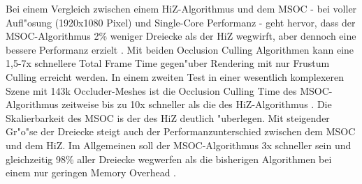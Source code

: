 \documentclass[journal]{vgtc}
\begin{document}
Bei einem Vergleich zwischen einem HiZ-Algorithmus und dem MSOC - bei voller Aufl"osung (1920x1080 Pixel) und Single-Core Performanz - geht hervor, dass der MSOC-Algorithmus 2\% weniger Dreiecke als der HiZ wegwirft, aber dennoch eine bessere Performanz erzielt \cite{MSOC}.
Mit beiden Occlusion Culling Algorithmen kann eine 1,5-7x schnellere Total Frame Time gegen"uber Rendering mit nur Frustum Culling erreicht werden.
In einem zweiten Test in einer wesentlich komplexeren Szene mit 143k Occluder-Meshes ist die Occlusion Culling Time des MSOC-Algorithmus zeitweise bis zu 10x schneller als die des HiZ-Algorithmus \cite{MSOC}.
Die Skalierbarkeit des MSOC is der des HiZ deutlich "uberlegen. Mit steigender Gr"o"se der Dreiecke steigt auch der Performanzunterschied zwischen dem MSOC und dem HiZ.
Im Allgemeinen soll der MSOC-Algorithmus 3x schneller sein und gleichzeitig 98\% aller Dreiecke wegwerfen als die bisherigen Algorithmen bei einem nur geringen Memory Overhead \cite{MSOC}.
\end{document}

